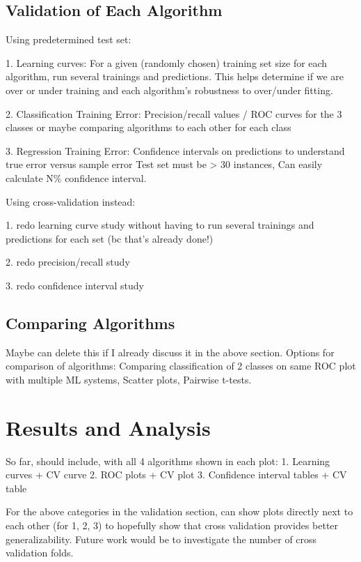 \documentclass{anstrans}
\begin{document}
\subsection{Validation of Each Algorithm}

Using predetermined test set:

1. Learning curves: For a given (randomly chosen) training set size for each
algorithm, run several trainings and predictions. This helps determine if we
are over or under training and each algorithm's robustness to over/under
fitting.  

2. Classification Training Error: Precision/recall values / ROC curves for the
3 classes or maybe comparing algorithms to each other for each class

3. Regression Training Error: Confidence intervals on predictions to understand
true error versus sample error Test set must be > 30 instances, Can easily
calculate N\% confidence interval.

Using cross-validation instead:

1. redo learning curve study without having to run several trainings and
predictions for each set (bc that's already done!)

2. redo precision/recall study 

3. redo confidence interval study


\subsection{Comparing Algorithms}

Maybe can delete this if I already discuss it in the above section. Options for
comparison of algorithms: Comparing classification of 2 classes on same ROC
plot with multiple ML systems, Scatter plots, Pairwise t-tests. 

\section{Results and Analysis}

So far, should include, with all 4 algorithms shown in each plot:
1. Learning curves  + CV curve
2. ROC plots + CV plot
3. Confidence interval tables + CV table

For the above categories in the validation section, can show plots directly
next to each other (for 1, 2, 3) to hopefully show that cross validation
provides better generalizability.  Future work would be to investigate the
number of cross validation folds. 
\end{document}

